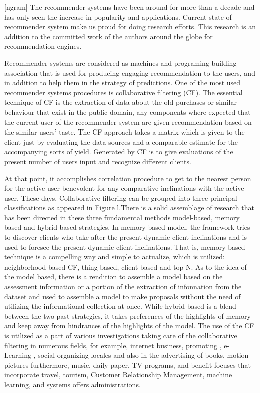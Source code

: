 \documentclass[10pt,conference]{IEEEtran}
\begin{document}
[ngram]
The recommender systems have been around for more than a decade and has only seen the increase in popularity and applications. Current state of recommender system make us proud for doing research efforts. This research is an addition to the committed work of the authors around the globe for recommendation engines.

Recommender systems are considered as machines and programing building association that is used for producing engaging recommendation to the users, and in addition to help them in the strategy of predictions. One of the most used recommender systems procedures is collaborative filtering (CF). The essential technique of CF is the extraction of data about the old purchases or similar behaviour that exist in the public domain, any components where expected that the current user of the recommender system are given recommendation based on the similar users' taste. The CF approach takes a matrix which is given to the client just by evaluating the data sources and a comparable estimate for the accompanying sorts of yield. Generated by CF is to give evaluations of the present number of users input and recognize different clients.

At that point, it accomplishes correlation procedure to get to the nearest person for the active user benevolent for any comparative inclinations with the active user. These days, Collaborative filtering can be grouped into three principal classifications as appeared in Figure l.There is a solid assemblage of research that has been directed in these three fundamental methods model-based, memory based and hybrid based strategies. In memory based model, the framework tries to discover clients who take after the present dynamic client inclinations and is used to foresee the present dynamic client inclinations. That is, memory-based technique is a compelling way and simple to actualize, which is utilized: neighborhood-based CF, thing based, client based and top-N. As to the idea of the model based, there is a rendition to assemble a model based on the assessment information or a portion of the extraction of infonnation from the dataset and used to assemble a model to make proposals without the need of utilizing the informational collection at once. While hybrid based is a blend between the two past strategies, it takes preferences of the highlights of memory and keep away from hindrances of the highlights of the model. The use of the CF is utilized as a part of various investigations taking care of the collaborative filtering in numerous fields, for example, internet business, promoting , e-Learning , social organizing locales and also in the advertising of books, motion pictures furthermore, music, daily paper, TV programs, and benefit focuses that incorporate travel, tourism, Customer Relationship Management, machine learning, and systems offers administrations.
\end{document}
